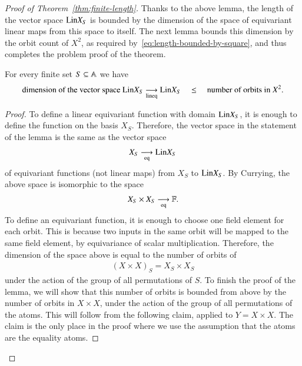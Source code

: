 \begin{proof}[Proof of Theorem~\ref{thm:finite-length}]
    Thanks to the above lemma, the length of the vector space $\mathrm{Lin} X_S$ is bounded by the dimension of the space of equivariant linear maps from this space  to itself. The next lemma bounds this dimension by the orbit count of $X^2$, as required by~\eqref{eq:length-bounded-by-square}, and thus  completes the problem   proof of the theorem. 

    \begin{lemma}\label{lem:bound-on-dim-for-finite-set} 
        For every finite set $S \subseteq \mathbb A$ we have 
        \begin{align*}
        \text{dimension of the vector space }\mathrm{Lin} X_S \underset{\text{lineq}}{\longrightarrow} \mathrm{Lin} X_S \quad  \leq \quad  \text{number of orbits in $X^2$.}
        \end{align*}
    \end{lemma}
    \begin{proof}
        To define a  linear equivariant function with domain $\mathrm{Lin} X_S$, it is enough to define the function on the basis $X_S$. Therefore, the vector space in the statement of the lemma is the same as the vector space  
        \begin{align*}
            X_S \underset{\text{eq}}{\longrightarrow} \mathrm{Lin} X_S
        \end{align*}
        of equivariant functions (not linear maps) from $X_S$ to $\mathrm{Lin} X_S$.  By Currying, the above space is isomorphic to  the space 
        \begin{align*}
        X_S \times X_S \underset{\text{eq}}{\longrightarrow} \mathbb F.
        \end{align*}
        To define an equivariant function, it is enough to choose one field element for each orbit. This is because two inputs in the same orbit will be mapped to the same field element, by equivariance of scalar multiplication.  Therefore, the dimension of the space above is equal to the number of orbits of
        \begin{align*}
        (X \times X)_S = X_S \times X_S
        \end{align*}
        under the action of the group of all permutations of $S$. To finish the proof of the lemma, we will show that this number of orbits is bounded from above by the number of orbits in $X \times X$, under the action of the group of  all permutations of the atoms. This will follow from the    following claim, applied to $Y = X \times X$. The claim is the only place in the proof where we use the assumption that the atoms are the equality atoms.


\end{proof}
\end{proof}
